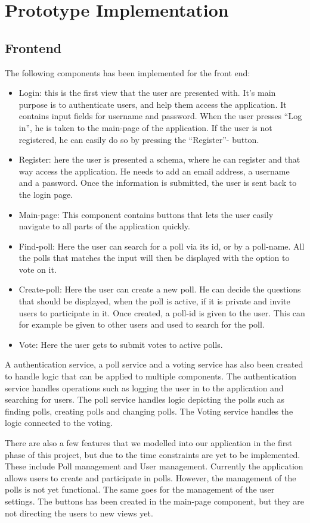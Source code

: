 \section{Prototype Implementation}
\label{sec:implementation}

\subsection{Frontend}
The following components has been implemented for the front end:

\begin{itemize}
	\item Login: this is the first view that the user are presented with. It’s main purpose is to
authenticate users, and help them access the application. It contains input fields for
username and password. When the user presses “Log in”, he is taken to the main-page of the
application. If the user is not registered, he can easily do so by pressing the “Register”-
button.
	\item Register: here the user is presented a schema, where he can register and that way access the
application. He needs to add an email address, a username and a password. Once the
information is submitted, the user is sent back to the login page.
	\item Main-page: This component contains buttons that lets the user easily navigate to all parts of
the application quickly.
	\item Find-poll: Here the user can search for a poll via its id, or by a poll-name. All the polls that
matches the input will then be displayed with the option to vote on it.
	\item Create-poll: Here the user can create a new poll. He can decide the questions that should be
displayed, when the poll is active, if it is private and invite users to participate in it. Once
created, a poll-id is given to the user. This can for example be given to other users and used
to search for the poll.
	\item Vote: Here the user gets to submit votes to active polls.
\end{itemize}

A authentication service, a poll service and a voting service has also been created to handle logic that
can be applied to multiple components. The authentication service handles operations such as
logging the user in to the application and searching for users. The poll service handles logic depicting
the polls such as finding polls, creating polls and changing polls. The Voting service handles the logic
connected to the voting.

There are also a few features that we modelled into our application in the first phase of this project,
but due to the time constraints are yet to be implemented. These include Poll management and User
management. Currently the application allows users to create and participate in polls. However, the
management of the polls is not yet functional. The same goes for the management of the user
settings. The buttons has been created in the main-page component, but they are not directing the
users to new views yet.